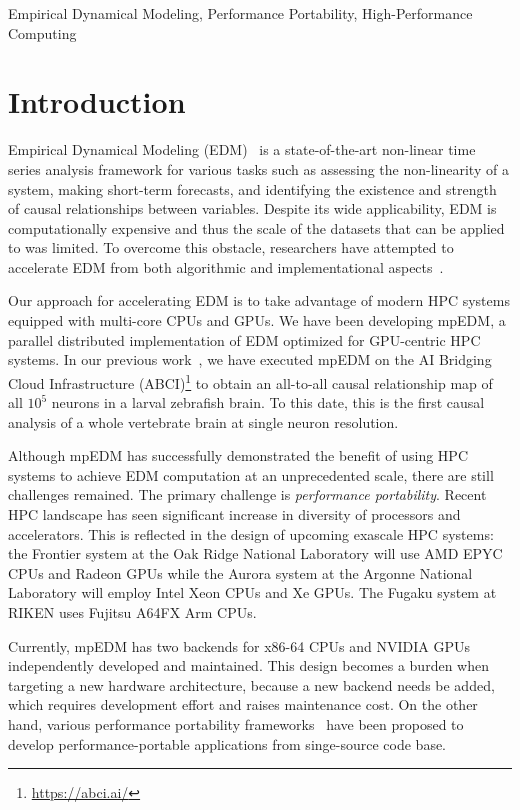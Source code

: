 \documentclass[conference]{IEEEtran}
\begin{document}
\begin{IEEEkeywords}
    Empirical Dynamical Modeling, Performance Portability, High-Performance
    Computing
\end{IEEEkeywords}

\section{Introduction}

Empirical Dynamical Modeling (EDM)~\cite{Chang2017} is a state-of-the-art
non-linear time series analysis framework for various tasks such as assessing
the non-linearity of a system, making short-term forecasts, and identifying
the existence and strength of causal relationships between variables. Despite
its wide applicability, EDM is computationally expensive and thus the scale of
the datasets that can be applied to was limited. To overcome this obstacle,
researchers have attempted to accelerate EDM  from both algorithmic and
implementational aspects~\cite{Pu2019,Ma2017}.

Our approach for accelerating EDM is to take advantage of modern HPC systems
equipped with multi-core CPUs and GPUs. We have been developing mpEDM, a
parallel distributed implementation of EDM optimized for GPU-centric HPC
systems. In our previous work~\cite{mpedm}, we have executed mpEDM on
the AI Bridging Cloud Infrastructure (ABCI)\footnote{\url{https://abci.ai/}}
to obtain an all-to-all causal relationship map of all $10^5$ neurons in a
larval zebrafish brain. To this date, this is the first causal analysis of a
whole vertebrate brain at single neuron resolution.

Although mpEDM has successfully demonstrated the benefit of using HPC systems
to achieve EDM computation at an unprecedented scale, there are still
challenges remained. The primary challenge is \textit{performance portability}.
Recent HPC landscape has seen significant increase in diversity of processors
and accelerators. This is reflected in the design of upcoming exascale HPC
systems: the Frontier system at the Oak Ridge National Laboratory will use AMD
EPYC CPUs and Radeon GPUs while the Aurora system at the Argonne National
Laboratory will employ Intel Xeon CPUs and Xe GPUs. The Fugaku system at RIKEN
uses Fujitsu A64FX Arm CPUs.

Currently, mpEDM has two backends for x86-64 CPUs and NVIDIA GPUs
independently developed and maintained. This design becomes a burden when
targeting a new hardware architecture, because a new backend needs be added,
which requires development effort and raises maintenance cost. On the other
hand, various performance portability frameworks~\cite{Deakin2019, Deakin2020}
have been proposed to develop performance-portable applications from
singe-source code base.
\end{document}
